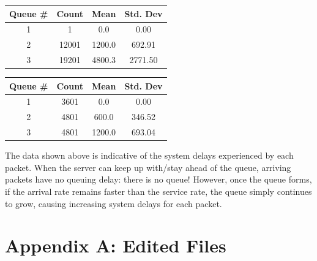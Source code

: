 \documentclass{article}
\begin{document}
\begin{minipage}{0.5\textwidth}
	\centering
	\begin{tabular}{|c|c|c|c|} \hline
		\textbf{Queue \#} & \textbf{Count} & \textbf{Mean} & \textbf{Std. Dev} \\ \hline
		1 & 1 & 0.0 & 0.00 \\ \hline
		2 & 12001 & 1200.0 & 692.91 \\ \hline
		3 & 19201 & 4800.3 & 2771.50 \\ \hline
	\end{tabular}
	\label{qlen}
\end{minipage}  
\begin{minipage}{0.5\textwidth}
	\centering
	\begin{tabular}{|c|c|c|c|} \hline
		\textbf{Queue \#} & \textbf{Count} & \textbf{Mean} & \textbf{Std. Dev} \\ \hline
		1 & 3601 & 0.0 & 0.00 \\ \hline
		2 & 4801 & 600.0 & 346.52 \\ \hline
		3 & 4801 & 1200.0 & 693.04 \\ \hline
	\end{tabular}
	\label{qTime}
\end{minipage}
\vspace{.25cm}

The data shown above is indicative of the system delays experienced by each packet.
When the server can keep up with/stay ahead of the queue, arriving packets have no queuing delay:  there is no queue!
However, once the queue forms, if the arrival rate remains faster than the service rate, the queue simply continues to grow, causing increasing system delays for each packet.

\newpage

\section*{Appendix A:  Edited Files}
\end{document}
